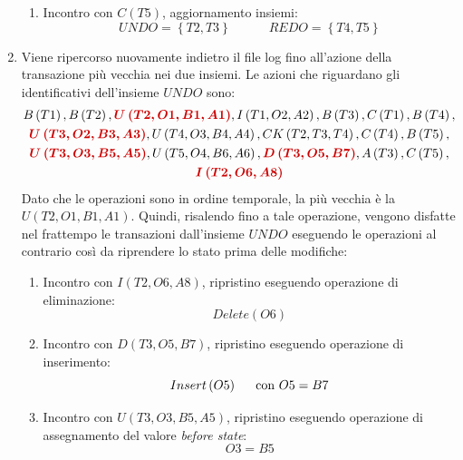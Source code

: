 \documentclass[a4paper]{article}
\begin{document}
\begin{enumerate}[label=\Roman*.]
\begin{enumerate}
			\item Incontro con $C\left(T5\right)$, aggiornamento insiemi:
			\begin{equation*}
				UNDO = \left\{T2, T3\right\} \hspace{3em} REDO = \left\{T4, T5\right\}
			\end{equation*}
		\end{enumerate}
		
		\item Viene ripercorso nuovamente indietro il file log fino all'azione della transazione più vecchia nei due insiemi. Le azioni che riguardano gli identificativi dell'insieme $UNDO$ sono:
		\begin{gather*}
			B\left(T1\right), B\left(T2\right), \textcolor{Red3}{\boldsymbol{U\left(T2,O1,B1,A1\right)}}, I\left(T1,O2,A2\right), B\left(T3\right), C\left(T1\right), B\left(T4\right), \\
			\textcolor{Red3}{\boldsymbol{U\left(T3, O2, B3, A3\right)}}, U\left(T4, O3, B4, A4\right), CK\left(T2, T3, T4\right), C\left(T4\right), B\left(T5\right), \\
			\textcolor{Red3}{\boldsymbol{U\left(T3,O3,B5,A5\right)}}, U\left(T5,O4,B6,A6\right), \textcolor{Red3}{\boldsymbol{D\left(T3,O5,B7\right)}}, A\left(T3\right), C\left(T5\right), \\
			\textcolor{Red3}{\boldsymbol{I\left(T2, O6, A8\right)}}
		\end{gather*}
		Dato che le operazioni sono in ordine temporale, la più vecchia è la $U\left(T2, O1, B1, A1\right)$. Quindi, risalendo fino a tale operazione, vengono disfatte nel frattempo le transazioni dall'insieme $UNDO$ eseguendo le operazioni al contrario così da riprendere lo stato prima delle modifiche:
		\begin{enumerate}
			\item Incontro con $I\left(T2, O6, A8\right)$, ripristino eseguendo operazione di eliminazione:
			\begin{equation*}
				Delete\left(O6\right)
			\end{equation*}
			
			\item Incontro con $D\left(T3, O5, B7\right)$, ripristino eseguendo operazione di inserimento:
			\begin{equation*}
				Insert\left(O5\right) \hspace{1.5em} \text{con } O5 = B7
			\end{equation*}
		
			\item Incontro con $U\left(T3, O3, B5, A5\right)$, ripristino eseguendo operazione di assegnamento del valore \emph{before state}:
			\begin{equation*}
				O3 = B5
			\end{equation*}
		

\end{enumerate}
\end{enumerate}
\end{document}
